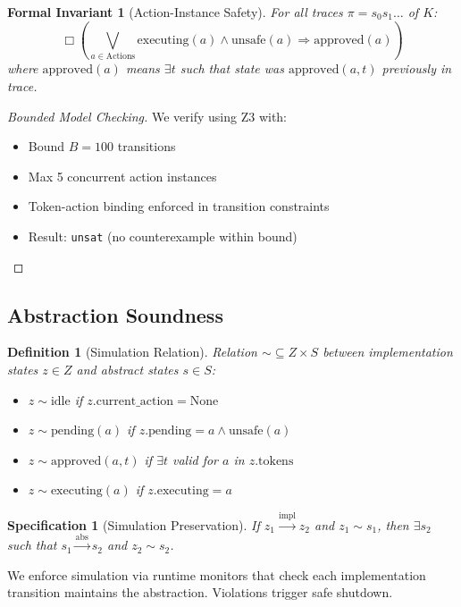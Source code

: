 \documentclass[12pt]{article}
\newtheorem{definition}{Definition}[section]
\newtheorem{spec}{Specification}[section]
\newtheorem{invariant}{Formal Invariant}[section]
\begin{document}
\begin{invariant}[Action-Instance Safety]
For all traces $\pi = s_0 s_1 \dots$ of $K$:
\[
\Box\left(\bigvee_{a \in \text{Actions}} \text{executing}(a) \land \text{unsafe}(a) \Rightarrow \text{approved}(a)\right)
\]
where $\text{approved}(a)$ means $\exists t$ such that state was $\text{approved}(a,t)$ previously in trace.
\end{invariant}

\begin{proof}[Bounded Model Checking]
We verify using Z3 with:
\begin{itemize}
    \item Bound $B=100$ transitions
    \item Max 5 concurrent action instances
    \item Token-action binding enforced in transition constraints
    \item Result: \texttt{unsat} (no counterexample within bound)
\end{itemize}
\end{proof}

\subsection{Abstraction Soundness}

\begin{definition}[Simulation Relation]
Relation $\sim \subseteq Z \times S$ between implementation states $z \in Z$ and abstract states $s \in S$:
\begin{itemize}
    \item $z \sim \text{idle}$ if $z.\text{current\_action} = \text{None}$
    \item $z \sim \text{pending}(a)$ if $z.\text{pending} = a \land \text{unsafe}(a)$
    \item $z \sim \text{approved}(a,t)$ if $\exists t$ valid for $a$ in $z.\text{tokens}$
    \item $z \sim \text{executing}(a)$ if $z.\text{executing} = a$
\end{itemize}
\end{definition}

\begin{spec}[Simulation Preservation]
If $z_1 \xrightarrow{\text{impl}} z_2$ and $z_1 \sim s_1$, then $\exists s_2$ such that $s_1 \xrightarrow{\text{abs}} s_2$ and $z_2 \sim s_2$.
\end{spec}

\begin{remark}
We enforce simulation via runtime monitors that check each implementation transition maintains the abstraction. Violations trigger safe shutdown.
\end{remark}
\end{document}
